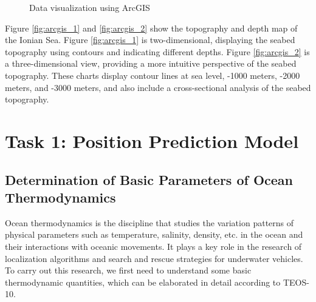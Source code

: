 \documentclass[12pt]{article}
\begin{document}
\begin{figure}[htb]
    \centering
    \caption{Data visualization using ArcGIS}
\end{figure}


Figure \ref{fig:arcgis_1} and \ref{fig:arcgis_2} show the topography and depth map of the Ionian Sea. Figure \ref{fig:arcgis_1} is two-dimensional, displaying the seabed topography using contours and indicating different depths. Figure \ref{fig:arcgis_2} is a three-dimensional view, providing a more intuitive perspective of the seabed topography. These charts display contour lines at sea level, -1000 meters, -2000 meters, and -3000 meters, and also include a cross-sectional analysis of the seabed topography.

\section{Task 1: Position Prediction Model}

\subsection{Determination of Basic Parameters of Ocean Thermodynamics}

Ocean thermodynamics is the discipline that studies the variation patterns of physical parameters such as temperature, salinity, density, etc. in the ocean and their interactions with oceanic movements. It plays a key role in the research of localization algorithms and search and rescue strategies for underwater vehicles. To carry out this research, we first need to understand some basic thermodynamic quantities, which can be elaborated in detail according to TEOS-10.
\end{document}
